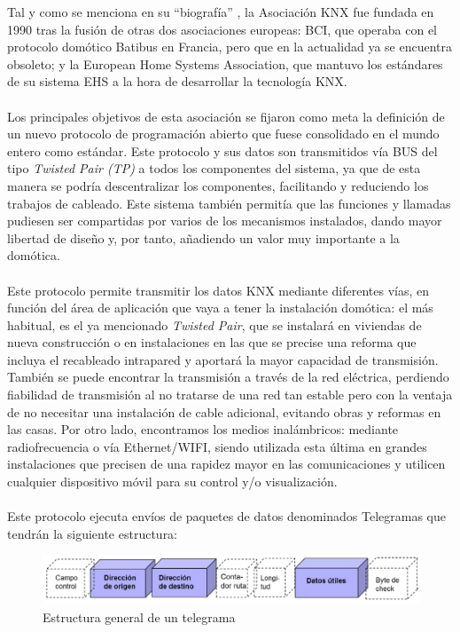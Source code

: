Tal y como se menciona en su “biografía” \cite{KNX:2021}, la Asociación KNX fue fundada en 1990 tras la fusión de otras dos asociaciones europeas: BCI, que operaba con el protocolo domótico Batibus  en Francia, pero que en la actualidad ya se encuentra obsoleto; y la European Home Systems Association, que mantuvo los estándares de su sistema EHS a la hora de desarrollar la tecnología KNX.\\\\
Los principales objetivos de esta asociación se fijaron como meta la definición de un nuevo protocolo de programación abierto que fuese consolidado en el mundo entero como estándar. Este protocolo y sus datos son transmitidos vía BUS del tipo \textit{Twisted Pair (TP)} a todos los componentes del sistema, ya que de esta manera se podría descentralizar los componentes, facilitando y reduciendo los trabajos de cableado. Este sistema también permitía que las funciones y llamadas pudiesen ser compartidas por varios de los mecanismos instalados, dando mayor libertad de diseño y, por tanto, añadiendo un valor muy importante a la domótica.\\\\
Este protocolo permite transmitir los datos KNX mediante diferentes vías, en función del área de aplicación que vaya a tener la instalación domótica: el más habitual, es el ya mencionado \textit{Twisted Pair}, que se instalará en viviendas de nueva construcción o en instalaciones en las que se precise una reforma que incluya el recableado intrapared y aportará la mayor capacidad de transmisión. También se puede encontrar la transmisión a través de la red eléctrica, perdiendo fiabilidad de transmisión al no tratarse de una red tan estable pero con la ventaja de no necesitar una instalación de cable adicional, evitando obras y reformas en las casas. Por otro lado, encontramos los medios inalámbricos: mediante radiofrecuencia o vía Ethernet/WIFI, siendo utilizada esta última en grandes instalaciones que precisen de una rapidez mayor en las comunicaciones y utilicen cualquier dispositivo móvil para su control y/o visualización.\\\\
Este protocolo ejecuta envíos de paquetes de datos denominados Telegramas que tendrán la siguiente estructura: 
\begin{figure}[H]
\centering
\includegraphics[width=1\textwidth]{figures/telegrama.png} 
\caption{Estructura general de un telegrama}
\label{fig:telegrama}
\end{figure}

